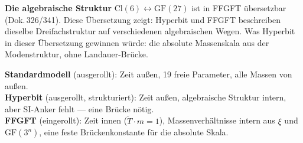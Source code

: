 \textbf{Die algebraische Struktur} $\mathrm{Cl}(6) \leftrightarrow
\mathrm{GF}(27)$ ist in FFGFT übersetzbar (Dok.\,326/341). Diese
Übersetzung zeigt: Hyperbit und FFGFT beschreiben dieselbe
Dreifachstruktur auf verschiedenen algebraischen Wegen. 
Was Hyperbit in dieser Übersetzung gewinnen würde: die absolute
Massenskala aus der Modenstruktur, ohne Landauer-Brücke.

\begin{keyresult}[Dok.\,307]
\textbf{Standardmodell} (ausgerollt): Zeit außen, 19 freie Parameter,
alle Massen von außen.\\[4pt]
\textbf{Hyperbit} (ausgerollt, strukturiert): Zeit außen, algebraische
Struktur intern, aber SI-Anker fehlt --- eine Brücke nötig.\\[4pt]
\textbf{FFGFT} (eingerollt): Zeit innen ($\tilde{T}\cdot m = 1$),
Massenverhältnisse intern aus $\xi$ und $\mathrm{GF}(3^n)$,
eine feste Brückenkonstante für die absolute Skala.
\end{keyresult}
